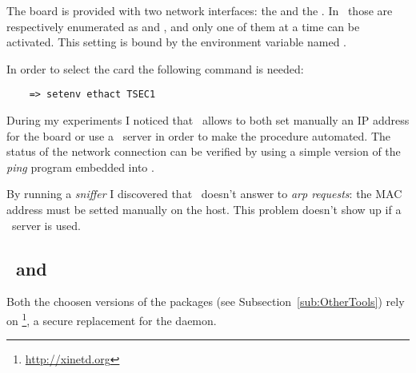     The board is provided with two network interfaces: the
     and the . In
    \uBoot\ those are respectively enumerated as  and
    , and only one of them at a time can be
    activated. This setting is bound by the environment variable
    named .

    In order to select the  card the following
    command is needed:
\begin{lstlisting}
    => setenv ethact TSEC1
\end{lstlisting}


    During my experiments I noticed that \uBoot\ allows to both set
    manually an IP address for the board or use a \BootP\ server in order
    to make the procedure automated. The status of the network connection
    can be verified by using a simple version of the \emph{ping} program
    embedded into \uBoot.

    By running a \emph{sniffer} I discovered that \uBoot\ doesn't answer
    to \emph{arp requests}: the MAC address must be setted manually on the
    host. This problem doesn't show up if a \BootP\ server is used.


\subsection{ \BootPd\ and \TFTPd } \label{sub:Xinetd}

    Both the choosen versions of the packages (see
    Subsection~\ref{sub:OtherTools}) rely on \footnote{
        \url{http://xinetd.org}
    }, a secure replacement for the  daemon.

